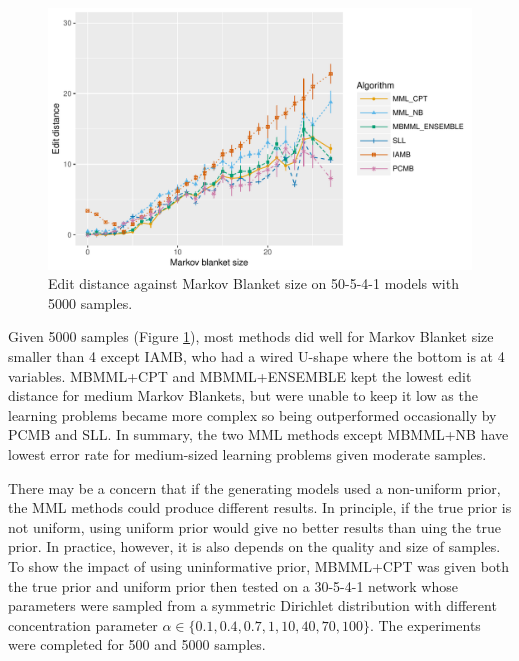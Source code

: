 \documentclass{svmult}
\begin{document}
\begin{figure}[hbt]
  \centering
    \includegraphics[scale=0.6]{figures/ed_vs_mbsize_50_5_4_1_5000.pdf}
  \caption{Edit distance against Markov Blanket size on 50-5-4-1 models with 5000 samples.}
  \label{fg:ed_mb_50_5000}
\end{figure}
Given 5000 samples (Figure \ref{fg:ed_mb_50_5000}), most methods did well for Markov Blanket size smaller than 4 except IAMB, who had a wired U-shape where the bottom is at 4 variables. MBMML+CPT and MBMML+ENSEMBLE kept the lowest edit distance for medium Markov Blankets, but were unable to keep it low as the learning problems became more complex so being outperformed occasionally by PCMB and SLL. In summary, the two MML methods except MBMML+NB have lowest error rate for medium-sized learning problems given moderate samples. 

There may be a concern that if the generating models used a non-uniform prior, the MML methods could produce different results. In principle, if the true prior is not uniform, using uniform prior would give no better results than uing the true prior. In practice, however, it is also depends on the quality and size of samples. To show the impact of using uninformative prior, MBMML+CPT was given both the true prior and uniform prior then tested on a 30-5-4-1 network whose parameters were sampled from a symmetric Dirichlet distribution with different concentration parameter $\alpha \in \{0.1, 0.4, 0.7, 1, 10, 40, 70, 100\}$. The experiments were completed for 500 and 5000 samples. 
\end{document}
